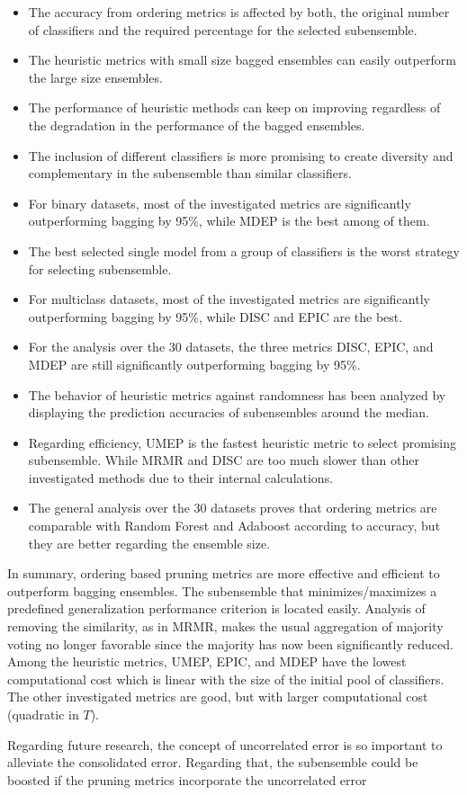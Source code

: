 \begin{itemize}[nosep,parsep=2pt]
    \item The accuracy from ordering metrics is affected by both, the original number of classifiers and the required percentage for the selected subensemble.
    \item The heuristic metrics with small size bagged ensembles can easily outperform the large size ensembles.
    \item The performance of heuristic methods can keep on improving regardless of the degradation in the performance of the bagged ensembles.
     \item The inclusion of different classifiers is more promising to create diversity and complementary in the subensemble than similar classifiers. 
    \item For binary datasets, most of the investigated metrics are significantly outperforming bagging by 95\%, while MDEP is the best among of them.
    \item The best selected single model from a group of classifiers is the worst strategy for selecting subensemble. 
    \item For multiclass datasets, most of the investigated metrics are significantly outperforming bagging by 95\%, while DISC and EPIC are the best. 
    \item For the analysis over the 30 datasets, the three metrics DISC, EPIC, and MDEP are still significantly outperforming bagging by 95\%.
    \item The behavior of heuristic metrics against randomness has been analyzed by displaying the prediction accuracies of subensembles around the median.
    \item Regarding efficiency, UMEP is the fastest heuristic metric to select promising subensemble. While MRMR and DISC are too much slower than other investigated methods due to their internal calculations.
    \item The general analysis over the 30 datasets proves that ordering metrics are comparable with Random Forest and Adaboost according to accuracy, but they are better regarding the ensemble size. 
\end{itemize}

In summary, ordering based pruning metrics are more effective and efficient to outperform bagging ensembles. The subensemble that minimizes/maximizes a predefined generalization performance criterion is located easily. Analysis of removing the similarity, as in MRMR, makes the usual aggregation of majority voting no longer favorable since the majority has now been significantly reduced. Among the heuristic metrics, UMEP, EPIC, and MDEP have the lowest computational cost which is linear with the size of the initial pool of classifiers. The other investigated metrics are good, but with larger computational cost (quadratic in $T$). 


Regarding future research, the concept of uncorrelated error is so important to alleviate the consolidated error. Regarding that, the subensemble could be boosted if the pruning metrics incorporate the uncorrelated error 